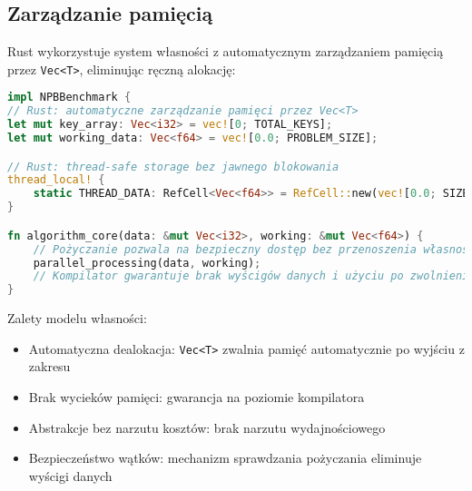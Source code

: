 \subsection{Zarządzanie pamięcią}
Rust wykorzystuje system własności z automatycznym zarządzaniem pamięcią przez \texttt{Vec<T>}, eliminując ręczną alokację:
\begin{lstlisting}[language=Rust, caption={Zarządzanie pamięcią w benchmarkach NPB w języku Rust}, label={lst:rust_memory_management}]
impl NPBBenchmark {
// Rust: automatyczne zarządzanie pamięci przez Vec<T>
let mut key_array: Vec<i32> = vec![0; TOTAL_KEYS];
let mut working_data: Vec<f64> = vec![0.0; PROBLEM_SIZE];

// Rust: thread-safe storage bez jawnego blokowania
thread_local! {
    static THREAD_DATA: RefCell<Vec<f64>> = RefCell::new(vec![0.0; SIZE]);
}

fn algorithm_core(data: &mut Vec<i32>, working: &mut Vec<f64>) {
    // Pożyczanie pozwala na bezpieczny dostęp bez przenoszenia własności
    parallel_processing(data, working);
    // Kompilator gwarantuje brak wyścigów danych i użyciu po zwolnieniu
}
\end{lstlisting}
Zalety modelu własności:
\begin{itemize}
    \item Automatyczna dealokacja: \texttt{Vec<T>} zwalnia pamięć automatycznie po wyjściu z zakresu
    \item Brak wycieków pamięci: gwarancja na poziomie kompilatora
    \item Abstrakcje bez narzutu kosztów: brak narzutu wydajnościowego
    \item Bezpieczeństwo wątków: mechanizm sprawdzania pożyczania eliminuje wyścigi danych
\end{itemize}

